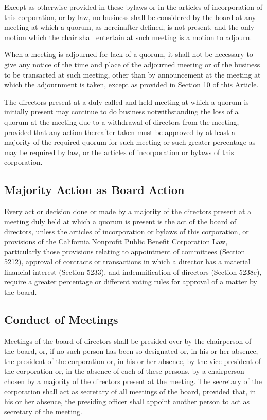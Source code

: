 \documentclass{article}
\begin{document}
	Except as otherwise provided in these bylaws or in the articles of incorporation of this corporation, or by law, no business shall be considered by the board at any meeting at which a quorum, as hereinafter defined, is not present, and the only motion which the chair shall entertain at such meeting is a motion to adjourn.
	
	When a meeting is adjourned for lack of a quorum, it shall not be necessary to give any notice of the time and place of the adjourned meeting or of the business to be transacted at such meeting, other than by announcement at the meeting at which the adjournment is taken, except as provided in Section 10 of this Article.
	
	The directors present at a duly called and held meeting at which a quorum is initially present may continue to do business notwithstanding the loss of a quorum at the meeting due to a withdrawal of directors from the meeting, provided that any action thereafter taken must be approved by at least a majority of the required quorum for such meeting or such greater percentage as may be required by law, or the articles of incorporation or bylaws of this corporation.
	
	\subsection{Majority Action as Board Action}
	Every act or decision done or made by a majority of the directors present at a meeting duly held at which a quorum is present is the act of the board of directors, unless the articles of incorporation or bylaws of this corporation, or provisions of the California Nonprofit Public Benefit Corporation Law, particularly those provisions relating to appointment of committees (Section 5212), approval of contracts or transactions in which a director has a material financial interest (Section 5233), and indemnification of directors (Section 5238e), require a greater percentage or different voting rules for approval of a matter by the board.
	\subsection{Conduct of Meetings}
	Meetings of the board of directors shall be presided over by the chairperson of the board, or, if no such person has been so designated or, in his or her absence, the president of the corporation or, in his or her absence, by the vice president of the corporation or, in the absence of each of these persons, by a chairperson chosen by a majority of the directors present at the meeting. The secretary of the corporation shall act as secretary of all meetings of the board, provided that, in his or her absence, the presiding officer shall appoint another person to act as secretary of the meeting.
	
\end{document}
